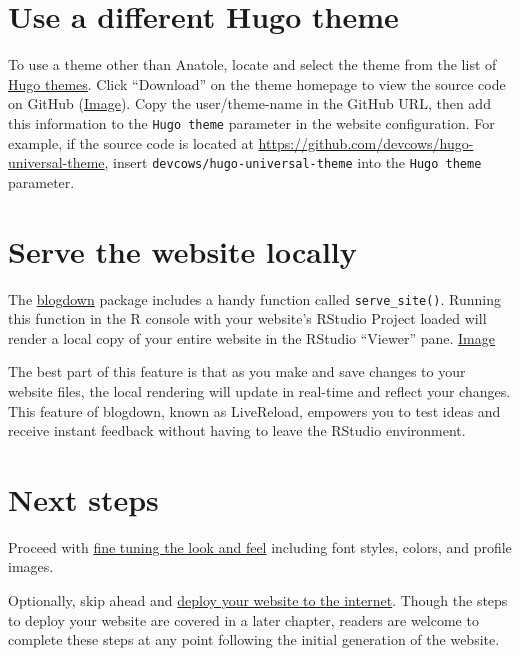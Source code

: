 \documentclass[
]{book}
\begin{document}
\hypertarget{use-a-different-hugo-theme}{%
\section{Use a different Hugo theme}\label{use-a-different-hugo-theme}}

To use a theme other than Anatole, locate and select the theme from the list of \href{https://themes.gohugo.io/}{Hugo themes}. Click ``Download'' on the theme homepage to view the source code on GitHub (\href{https://i.imgur.com/ld35gNP.png}{Image}). Copy the user/theme-name in the GitHub URL, then add this information to the \texttt{Hugo\ theme} parameter in the website configuration. For example, if the source code is located at \url{https://github.com/devcows/hugo-universal-theme}, insert \texttt{devcows/hugo-universal-theme} into the \texttt{Hugo\ theme} parameter.

\hypertarget{serve-site}{%
\section{Serve the website locally}\label{serve-site}}

The \href{https://bookdown.org/yihui/blogdown/}{blogdown} package includes a handy function called \texttt{serve\_site()}. Running this function in the R console with your website's RStudio Project loaded will render a local copy of your entire website in the RStudio ``Viewer'' pane. \href{https://i.imgur.com/oxZgeqM.png}{Image}

The best part of this feature is that as you make and save changes to your website files, the local rendering will update in real-time and reflect your changes. This feature of blogdown, known as LiveReload, empowers you to test ideas and receive instant feedback without having to leave the RStudio environment.

\hypertarget{next-steps-2}{%
\section{Next steps}\label{next-steps-2}}

Proceed with \protect\hyperlink{fine-tune}{fine tuning the look and feel} including font styles, colors, and profile images.

Optionally, skip ahead and \protect\hyperlink{deploy}{deploy your website to the internet}. Though the steps to deploy your website are covered in a later chapter, readers are welcome to complete these steps at any point following the initial generation of the website.
\end{document}
